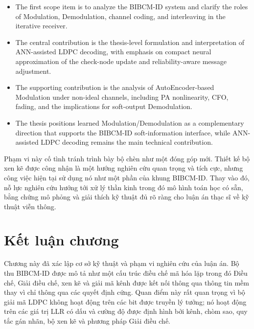 \begin{itemize}
\item The first scope item is to analyze the BIBCM-ID system and clarify the roles of Modulation, Demodulation, channel coding, and interleaving in the iterative receiver.
\end{itemize}
\begin{itemize}
\item The central contribution is the thesis-level formulation and interpretation of ANN-assisted LDPC decoding, with emphasis on compact neural approximation of the check-node update and reliability-aware message adjustment.
\end{itemize}
\begin{itemize}
\item The supporting contribution is the analysis of AutoEncoder-based Modulation under non-ideal channels, including PA nonlinearity, CFO, fading, and the implications for soft-output Demodulation.
\end{itemize}
\begin{itemize}
\item The thesis positions learned Modulation/Demodulation as a complementary direction that supports the BIBCM-ID soft-information interface, while ANN-assisted LDPC decoding remains the main technical contribution.
\end{itemize}

Phạm vi này cố tình tránh trình bày bộ chèn như một đóng góp mới. Thiết kế bộ xen kẽ được công nhận là một hướng nghiên cứu quan trọng và tích cực, nhưng công việc hiện tại sử dụng nó như một phần của khung BIBCM-ID. Thay vào đó, nỗ lực nghiên cứu hướng tới xử lý thần kinh trong đó mô hình toán học có sẵn, bằng chứng mô phỏng và giải thích kỹ thuật đủ rõ ràng cho luận án thạc sĩ về kỹ thuật viễn thông.

\section{Kết luận chương}
Chương này đã xác lập cơ sở kỹ thuật và phạm vi nghiên cứu của luận án. Bộ thu BIBCM-ID được mô tả như một cấu trúc điều chế mã hóa lặp trong đó Điều chế, Giải điều chế, xen kẽ và giải mã kênh được kết nối thông qua thông tin mềm thay vì chỉ thông qua các quyết định cứng. Quan điểm này rất quan trọng vì bộ giải mã LDPC không hoạt động trên các bit được truyền lý tưởng; nó hoạt động trên các giá trị LLR có dấu và cường độ được định hình bởi kênh, chòm sao, quy tắc gán nhãn, bộ xen kẽ và phương pháp Giải điều chế.

